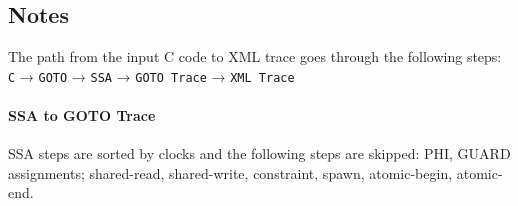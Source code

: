 \documentclass[12pt]{article}
\begin{document}
\subsection{Notes}

The path from the input C code to XML trace goes through the following steps:\\

\texttt{C} → \texttt{GOTO} → \texttt{SSA} → \texttt{GOTO Trace} → \texttt{XML Trace}

\paragraph{SSA to GOTO Trace}

SSA steps are sorted by clocks and the following steps are skipped: PHI, GUARD
assignments; shared-read, shared-write, constraint, spawn, atomic-begin,
atomic-end.
\end{document}
